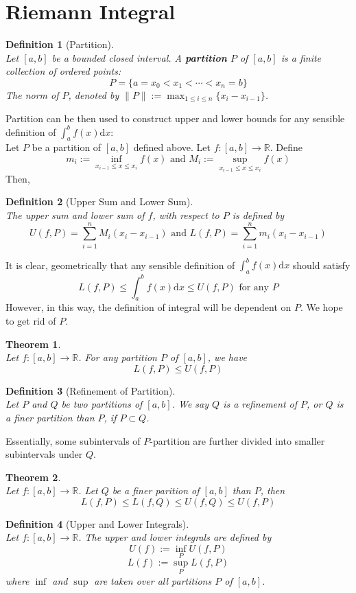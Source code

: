 \documentclass[12pt]{article}
\newcommand{\diff}{\mathrm{d}}
\newtheorem{definition}{Definition}[section]
\newtheorem{theorem}{Theorem}[section]
\theoremstyle{definition}
\begin{document}
\section{Riemann Integral}
\begin{definition}[Partition]
\hfill\\\normalfont Let $[a,b]$ be a bounded closed interval. A \textbf{partition} $P$ of $[a,b]$ is a finite collection of ordered points:
\[
P=\{a=x_0<x_1<\cdots<x_n=b\}
\]
The norm of $P$, denoted by $\|P\|:=\max_{1\leq i\leq n} \{x_i-x_{i-1}\}$.
\end{definition}
Partition can be then used to construct upper and lower bounds for any sensible definition of $\int_a^bf(x)\diff x$:\\
Let $P$ be a partition of $[a,b]$ defined above. Let $f:[a,b]\to \mathbb{R}$. Define
\[
m_i:=\inf_{x_{i-1}\leq x\leq x_i}f(x)\text{ and }M_i:=\sup_{x_{i-1}\leq x\leq x_i}f(x)
\]
Then,
\begin{definition}[Upper Sum and Lower Sum]
\hfill\\\normalfont The upper sum and lower sum of $f$, with respect to $P$ is defined by
\[
U(f,P)=\sum_{i=1}^n M_i(x_i-x_{i-1})\text{ and }L(f,P)=\sum_{i=1}^n m_i(x_i-x_{i-1})
\]
\end{definition}
It is clear, geometrically that any sensible definition of $\int_a^bf(x)\diff x$ should satisfy
\[
L(f,P)\leq \int_a^bf(x)\diff x\leq U(f,P)\text{ for any }P
\]
However, in this way, the definition of integral will be dependent on $P$. We hope to get rid of $P$.
\begin{theorem}
\hfill\\\normalfont Let $f:[a,b]\to \mathbb{R}$. For any partition $P$ of $[a,b]$, we have
\[
L(f,P)\leq U(f,P)
\]
\end{theorem}
\begin{definition}[Refinement of Partition]
\hfill\\\normalfont Let $P$ and $Q$ be two partitions of $[a,b]$. We say $Q$ is a refinement of $P$, or $Q$ is a finer partition than $P$, if $P\subset Q$.
\end{definition}
Essentially, some subintervals of $P$-partition are further divided into smaller subintervals under $Q$.
\begin{theorem}
\hfill\\\normalfont Let $f:[a,b]\to \mathbb{R}$. Let $Q$ be a finer parition of $[a,b]$ than $P$, then
\[
L(f,P)\leq L(f,Q)\leq U(f,Q)\leq U(f,P)
\]
\end{theorem}
\begin{definition}[Upper and Lower Integrals]
\hfill\\\normalfont Let $f:[a,b]\to\mathbb{R}$. The upper and lower integrals are defined by
\[
U(f):=\inf_P U(f,P)
\]
\[
L(f):=\sup_P L(f,P)
\]
where $\inf$ and $\sup$ are taken over all partitions $P$ of $[a,b]$.
\end{definition}
\end{document}
